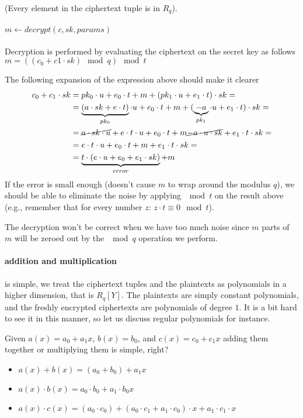 (Every element in the ciphertext tuple is in $R_q$).


\paragraph{$m \leftarrow decrypt(c,sk,params)$}

Decryption is performed by evaluating the ciphertext on the secret
key as follows $ m=((c_0+c1\cdot sk) \mod q) \mod t$

The following expansion of the expression above should make it clearer
\begin{align*}
c_{0}+c_{1}\cdot sk & =pk_{0}\cdot u+e_{0}\cdot t+m+(pk_{1}\cdot u+e_{1}\cdot t)\cdot sk=\\
 & =\underbrace{(a\cdot sk +e\cdot t)}_{pk_0} \cdot u + e_{0}\cdot t + m + (\underbrace{-a}_{pk_1}\cdot u+e_{1}\cdot t)\cdot sk=\\
 & = \cancel{a\cdot sk\cdot u} +e\cdot t\cdot u +e_{0}\cdot t + m  \cancel{-a\cdot u\cdot sk} +e_{1}\cdot t\cdot sk = \\
 & = e\cdot t\cdot u +e_{0}\cdot t + m  +e_{1}\cdot t\cdot sk = \\
 & = \underbrace{t\cdot (e\cdot u + e_0 +e_1\cdot sk)}_{error} + m
\end{align*}
If the error is small enough (doesn't cause $m$ to wrap around the modulus $q$), we should be able to eliminate the noise 
by applying $\mod t$ on the result above (e.g., remember that for every number $z$: $z\cdot t \equiv 0 \mod t$).

The decryption won't be correct when we have too much noise since $m$ parts of $m$
will be zeroed out by the $\mod q$ operation we perform.

\paragraph{addition and multiplication}
is simple, we treat the ciphertext tuples and the plaintexts as polynomials in a higher dimension,
that is $R_q[Y]$. The plaintexts are simply constant polynomials, and the freshly encrypted ciphertexts are polynomials 
of degree $1$.
It is a bit hard to see it in this manner, so let us discuss regular polynomials for instance.

Given $a(x)=a_0+a_1x$, $b(x)=b_0$, and $c(x)=c_0+c_1x$ adding them together or multiplying them is simple, right?
\begin{itemize}
    \item $a(x)+b(x)= (a_0+b_0)+a_1x$
    \item $a(x)\cdot b(x)= a_0\cdot b_0 + a_1\cdot b_0 x$
    \item $a(x) \cdot c(x)= (a_0\cdot c_0) +(a_0\cdot c_1 + a_1\cdot c_0)\cdot x + a_1\cdot c_1 \cdot x$
\end{itemize}

